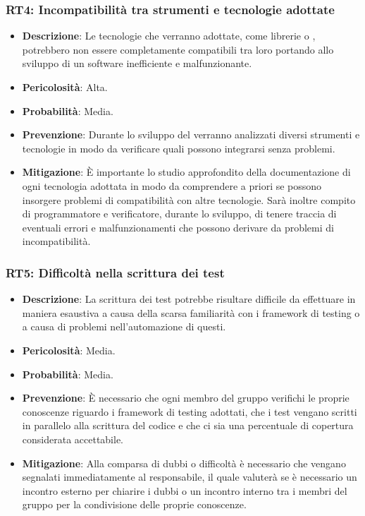 \subsubsection{RT4: Incompatibilità tra strumenti e tecnologie adottate}
\label{rischio:RT4}
\begin{itemize}
    \item \textbf{Descrizione}: Le tecnologie che verranno adottate, come librerie o , potrebbero non essere completamente compatibili tra loro portando allo sviluppo di un software inefficiente e malfunzionante.
    \item \textbf{Pericolosità}: Alta.
    \item \textbf{Probabilità}: Media.
    \item \textbf{Prevenzione}: Durante lo sviluppo del  verranno analizzati diversi strumenti e tecnologie in modo da verificare quali possono integrarsi senza problemi.
    \item \textbf{Mitigazione}: È importante lo studio approfondito della documentazione di ogni tecnologia adottata in modo da comprendere a priori se possono insorgere problemi di compatibilità con altre tecnologie.
    Sarà inoltre compito di programmatore e verificatore, durante lo sviluppo, di tenere traccia di eventuali errori e malfunzionamenti che possono derivare da problemi di incompatibilità.
\end{itemize}

\subsubsection{RT5: Difficoltà nella scrittura dei test}
\label{rischio:RT5}
\begin{itemize}
    \item \textbf{Descrizione}: La scrittura dei test potrebbe risultare difficile da effettuare in maniera esaustiva a causa della scarsa familiarità con i framework di testing o a causa di problemi nell'automazione di questi.
    \item \textbf{Pericolosità}: Media.
    \item \textbf{Probabilità}: Media.
    \item \textbf{Prevenzione}: È necessario che ogni membro del gruppo verifichi le proprie conoscenze riguardo i framework di testing adottati, che i test vengano scritti in parallelo alla scrittura del codice e che ci sia una percentuale di copertura considerata accettabile.
    \item \textbf{Mitigazione}: Alla comparsa di dubbi o difficoltà è necessario che vengano segnalati immediatamente al responsabile, il quale valuterà se è necessario un incontro esterno per chiarire i dubbi o un incontro interno tra i membri del gruppo per la condivisione delle proprie conoscenze.
\end{itemize}

